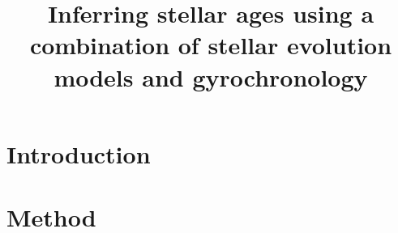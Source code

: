 \documentclass[useAMS, usenatbib, preprint, 12pt]{aastex}
\newcommand{\columbia}{3}
\newcommand{\cca}{2}
\newcommand{\amnh}{1}
\begin{document}
\title{Inferring stellar ages using a combination of stellar evolution models
and gyrochronology}



\begin{abstract}
    
\end{abstract}



\section{Introduction}
\label{section:intro}


\section{Method}
\label{section:method}


\end{document}
